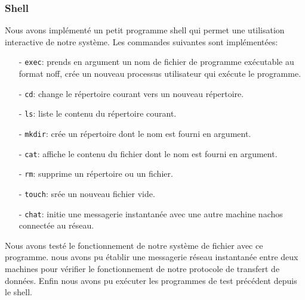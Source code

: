 \documentclass[11pt]{article}
\theoremstyle{definition}
\theoremstyle{definition}
\begin{document}
\subsubsection{Shell}
Nous avons implémenté un petit programme shell qui permet une utilisation interactive de notre système. Les commandes suivantes sont implémentées:
\begin{itemize}
\item[-] \texttt{exec}: prends en argument un nom de fichier de programme exécutable au format noff, crée un nouveau processus utilisateur qui exécute le programme.
\item[-] \texttt{cd}: change le répertoire courant vers un nouveau répertoire.
\item[-] \texttt{ls}: liste le contenu du répertoire courant.
\item[-] \texttt{mkdir}: crée un répertoire dont le nom est fourni en argument.
\item[-] \texttt{cat}: affiche le contenu du fichier dont le nom est fourni en argument.
\item[-] \texttt{rm}: supprime un répertoire ou un fichier.
\item[-] \texttt{touch}: srée un nouveau fichier vide.
\item[-] \texttt{chat}: initie une messagerie instantanée avec une autre machine
  nachos connectée au réseau.
\end{itemize}
Nous avons testé le fonctionnement de notre système de fichier avec ce programme.
nous avons pu établir une messagerie réseau instantanée entre deux machines pour vérifier le fonctionnement de notre protocole de transfert de données.
Enfin nous avons pu exécuter les programmes de test précédent depuis le shell.
\end{document}
